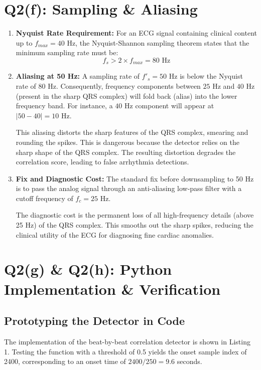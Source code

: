 \documentclass[10pt, a4paper]{article}
\begin{document}
\section{Q2(f): Sampling \& Aliasing}

\begin{enumerate}
    \item \textbf{Nyquist Rate Requirement:} For an ECG signal containing clinical content up to $f_{max} = 40$ Hz, the Nyquist-Shannon sampling theorem states that the minimum sampling rate must be:
    \begin{equation}
    f_s > 2 \times f_{max} = 80\text{ Hz}
    \end{equation}
    
    \item \textbf{Aliasing at 50 Hz:} A sampling rate of $f'_s = 50$ Hz is below the Nyquist rate of 80 Hz. Consequently, frequency components between $25$ Hz and $40$ Hz (present in the sharp QRS complex) will fold back (alias) into the lower frequency band. For instance, a $40$ Hz component will appear at $|50 - 40| = 10$ Hz. 
    
    This aliasing distorts the sharp features of the QRS complex, smearing and rounding the spikes. This is dangerous because the detector relies on the sharp shape of the QRS complex. The resulting distortion degrades the correlation score, leading to false arrhythmia detections.
    
    \item \textbf{Fix and Diagnostic Cost:} The standard fix before downsampling to 50 Hz is to pass the analog signal through an anti-aliasing low-pass filter with a cutoff frequency of $f_c = 25$ Hz. 
    
    The diagnostic cost is the permanent loss of all high-frequency details (above 25 Hz) of the QRS complex. This smooths out the sharp spikes, reducing the clinical utility of the ECG for diagnosing fine cardiac anomalies.
\end{enumerate}
\vspace{8mm}
\section{Q2(g) \& Q2(h): Python Implementation \& Verification}

\subsection{Prototyping the Detector in Code}
The implementation of the beat-by-beat correlation detector is shown in Listing 1. Testing the function with a threshold of 0.5 yields the onset sample index of 2400, corresponding to an onset time of $2400 / 250 = 9.6$ seconds.
\vspace{8mm}
\end{document}
